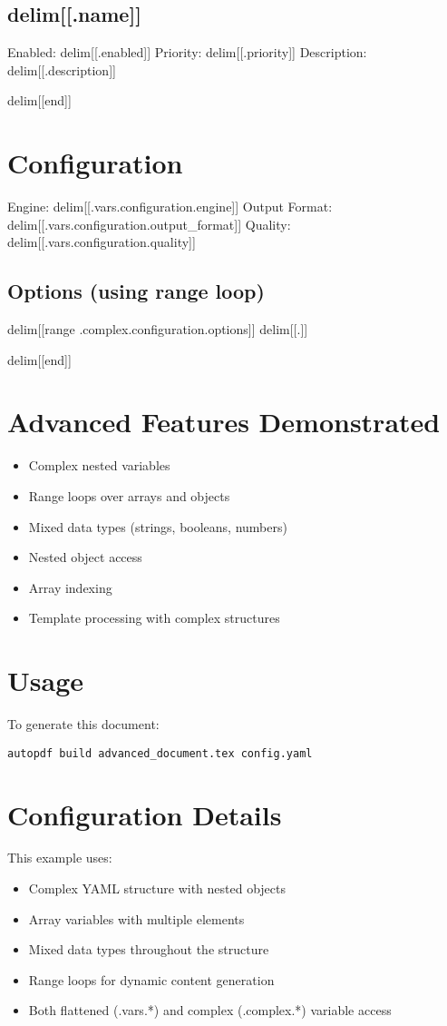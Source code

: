 \documentclass{article}
\begin{document}
\subsection{delim[[.name]]}
Enabled: delim[[.enabled]]
Priority: delim[[.priority]]
Description: delim[[.description]]\par
delim[[end]]

\section{Configuration}
Engine: delim[[.vars.configuration.engine]]
Output Format: delim[[.vars.configuration.output_format]]
Quality: delim[[.vars.configuration.quality]]

\subsection{Options (using range loop)}
delim[[range .complex.configuration.options]]
delim[[.]]\par
delim[[end]]

\section{Advanced Features Demonstrated}
\begin{itemize}
\item Complex nested variables
\item Range loops over arrays and objects
\item Mixed data types (strings, booleans, numbers)
\item Nested object access
\item Array indexing
\item Template processing with complex structures
\end{itemize}

\section{Usage}
To generate this document:
\begin{verbatim}
autopdf build advanced_document.tex config.yaml
\end{verbatim}

\section{Configuration Details}
This example uses:
\begin{itemize}
\item Complex YAML structure with nested objects
\item Array variables with multiple elements
\item Mixed data types throughout the structure
\item Range loops for dynamic content generation
\item Both flattened (.vars.*) and complex (.complex.*) variable access
\end{itemize}
\end{document}
